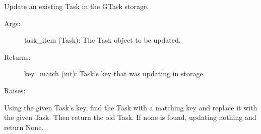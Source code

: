 \documentclass[letterpaper,10pt,english]{sphinxmanual}
\begin{document}
\begin{fulllineitems}
\begin{fulllineitems}
\end{fulllineitems}



\begin{fulllineitems}
\label{index:storage.GTaskStorage.update}
Update an existing Task in the GTask storage.
\begin{description}
\item[{Args:}] \leavevmode
task\_item (Task): The Task object to be updated.

\item[{Returns:}] \leavevmode
key\_match (int): Task's key that was updating in storage.

\end{description}

Raises:

Using the given Task's key, find the Task with a matching key and
replace it with the given Task. Then return the old Task. If none
is found, updating nothing and return None.

\end{fulllineitems}


\end{fulllineitems}


\end{document}
